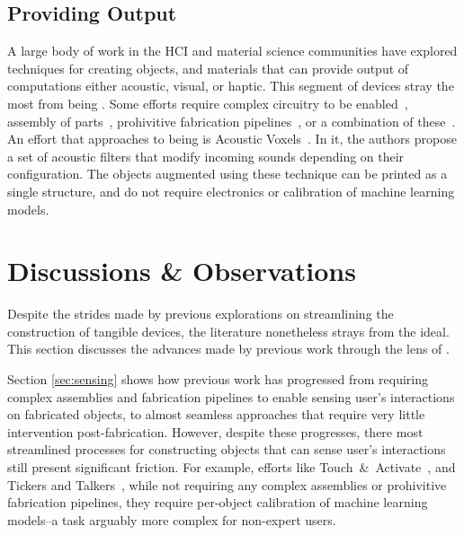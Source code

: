     \subsection{Providing Output} \label{sec:output}
      A large body of work in the HCI and material science communities have
      explored techniques for creating objects, and materials that can provide
      output of computations either acoustic, visual, or haptic. This segment of
      devices stray the most from being \pap. Some efforts require complex
      circuitry to be enabled~\cite{Slyper:2012, Groeger:2016}, assembly of
      parts~\cite{Ion:2017}, prohivitive fabrication pipelines~\cite{Kong:2014,
      Peng:2016, Brockmeyer:2013}, or a combination of these~\cite{Vazquez:2015,
      MacCurdy:2016, Neidlinger:2017}. An effort that approaches to being \pap
      is Acoustic Voxels~\cite{Li:2016}. In it, the authors propose a set of
      acoustic filters that modify incoming sounds depending on their
      configuration. The objects augmented using these technique can be printed
      as a single structure, and do not require electronics or calibration of
      machine learning models.

  \section{Discussions \& Observations}
    Despite the strides made by previous explorations on streamlining the
    construction of tangible devices, the literature nonetheless strays from the
    \papf ideal. This section discusses the advances made by previous work
    through the lens of \papf.

    Section \ref{sec:sensing} shows how previous work has progressed from
    requiring complex assemblies and fabrication pipelines to enable sensing
    user's interactions on fabricated objects, to almost seamless approaches
    that require very little intervention post-fabrication. However, despite
    these progresses, there most streamlined processes for constructing objects
    that can sense user's interactions still present significant friction. For
    example, efforts like Touch~\&~Activate~\cite{Ono:2013}, and Tickers and
    Talkers~\cite{Shi:2016}, while not requiring any complex assemblies or
    prohivitive fabrication pipelines, they require per-object calibration of
    machine learning models--a task arguably more complex for non-expert users. 

